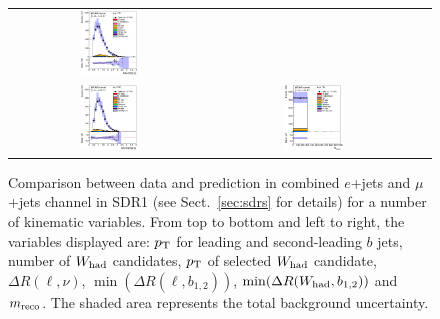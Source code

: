 \begin{figure}[htbp]
\begin{center}
\begin{tabular}{ccc}
\includegraphics[width=0.30\textwidth]{appendices/figures/sdrs/VLQAna_WbX_MinDRlb_ELEMUONCR5_1W_NOMINAL.eps} \\
\includegraphics[width=0.30\textwidth]{appendices/figures/sdrs/VLQAna_WbX_MinDRWb_ELEMUONCR5_1W_NOMINAL.eps} &
\includegraphics[width=0.30\textwidth]{appendices/figures/sdrs/VLQAna_WbX_1W_MWb_4_ELEMUONCR5_1W_NOMINAL.eps} & \\
\end{tabular}\caption{\small {Comparison between data and prediction in combined $e$+jets and $\mu$+jets channel in SDR1 (see Sect.~\ref{sec:sdrs} for details) 
for a number of kinematic variables. From top to bottom and left to right, the variables displayed are: $\pt$ for leading and second-leading $b$ jets,
number of $W_{\rm had}$  candidates, $\pt$ of selected $W_{\rm had}$  candidate, $\Delta R(\ell,\nu)$, $\min(\Delta R(\ell, b_{1,2}))$, 
$\min(\Delta R(W_{\rm had}, b_{1,2}))$ and $m_{\rm reco}$.
The shaded area represents the total background uncertainty.}}
\label{fig:ELEMUONCR5_3}
\end{center}
\end{figure}                                                                             
